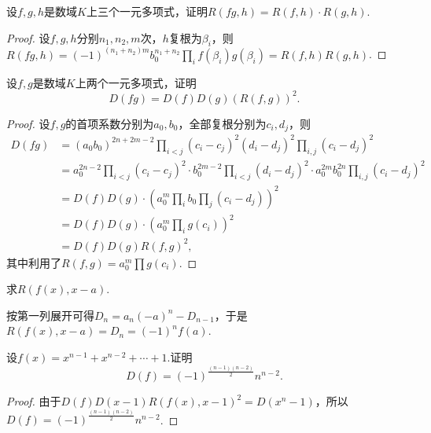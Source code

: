 \begin{prob}[6]
	设$f,g,h$是数域$K$上三个一元多项式，证明$R(fg,h)=R(f,h)\cdot R(g,h)$.
\end{prob}
\begin{proof}
	设$f,g,h$分别$n_1,n_2,m$次，$h$复根为$\beta_i$，则$\displaystyle R(fg,h)=(-1)^{(n_1+n_2)m}b_0^{n_1+n_2}\prod_i f(\beta_i)g(\beta_i)=R(f,h)R(g,h)$.
\end{proof}
\begin{prob}[7]
	设$f,g$是数域$K$上两个一元多项式，证明
	\[
		D(fg)=D(f)D(g)(R(f,g))^2.
	\]
\end{prob}
\begin{proof}
	设$f,g$的首项系数分别为$a_0,b_0$，全部复根分别为$c_i,d_j$，则
	\begin{align*}
		D(fg) & =(a_0b_0)^{2n+2m-2}\prod_{i<j}(c_i-c_j)^2(d_i-d_j)^2\prod_{i,j}(c_i-d_j)^2                                          \\
		      & =a_0^{2n-2}\prod_{i<j}(c_i-c_j)^2\cdot b_0^{2m-2}\prod_{i<j}(d_i-d_j)^2\cdot a_0^{2m}b_0^{2n}\prod_{i,j}(c_i-d_j)^2 \\
		      & =D(f)D(g)\cdot\left(a_0^m\prod_{i}b_0\prod_j(c_i-d_j)\right)^2                                                      \\
		      & =D(f)D(g)\cdot\left(a_0^m\prod_i g(c_i)\right)^2                                                                    \\
		      & =D(f)D(g)R(f,g)^2,
	\end{align*}
	其中利用了$R(f,g)=a_0^m\prod g(c_i)$.
\end{proof}
\begin{prob}[8]
	求$R(f(x),x-a)$.
\end{prob}
\begin{sol}
	按第一列展开可得$D_n=a_n(-a)^n-D_{n-1}$，于是$R(f(x),x-a)=D_n=(-1)^nf(a)$.
\end{sol}
\begin{prob}[9]
	设$f(x)=x^{n-1}+x^{n-2}+\cdots+1$.证明
	\[
		D(f)=(-1)^{\frac{(n-1)(n-2)}{2}}n^{n-2}.
	\]
\end{prob}
\begin{proof}
	由于$D(f)D(x-1)R(f(x),x-1)^2=D(x^n-1)$，所以$D(f)=(-1)^{\frac{(n-1)(n-2)}{2}}n^{n-2}$.
\end{proof}